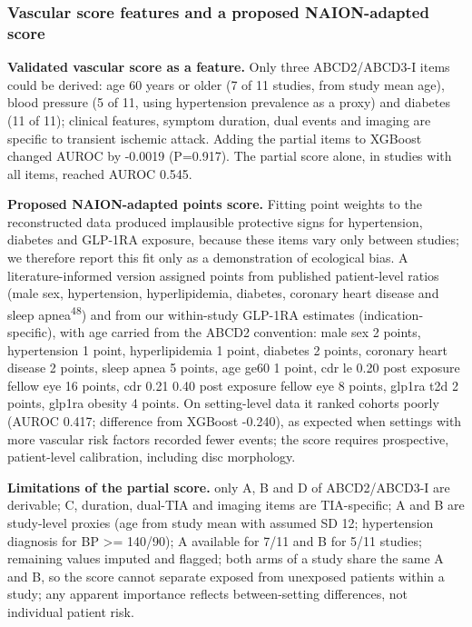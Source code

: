 \documentclass[
  11pt,
]{article}
\begin{document}
\subsubsection{Vascular score features and a proposed NAION-adapted
score}\label{vascular-score-features-and-a-proposed-naion-adapted-score}

\textbf{Validated vascular score as a feature.} Only three ABCD2/ABCD3-I
items could be derived: age 60 years or older (7 of 11 studies, from
study mean age), blood pressure (5 of 11, using hypertension prevalence
as a proxy) and diabetes (11 of 11); clinical features, symptom
duration, dual events and imaging are specific to transient ischemic
attack. Adding the partial items to XGBoost changed AUROC by -0.0019
(P=0.917). The partial score alone, in studies with all items, reached
AUROC 0.545.

\textbf{Proposed NAION-adapted points score.} Fitting point weights to
the reconstructed data produced implausible protective signs for
hypertension, diabetes and GLP-1RA exposure, because these items vary
only between studies; we therefore report this fit only as a
demonstration of ecological bias. A literature-informed version assigned
points from published patient-level ratios (male sex, hypertension,
hyperlipidemia, diabetes, coronary heart disease and sleep
apnea\textsuperscript{48}) and from our within-study GLP-1RA estimates
(indication-specific), with age carried from the ABCD2 convention: male
sex 2 points, hypertension 1 point, hyperlipidemia 1 point, diabetes 2
points, coronary heart disease 2 points, sleep apnea 5 points, age ge60
1 point, cdr le 0.20 post exposure fellow eye 16 points, cdr 0.21 0.40
post exposure fellow eye 8 points, glp1ra t2d 2 points, glp1ra obesity 4
points. On setting-level data it ranked cohorts poorly (AUROC 0.417;
difference from XGBoost -0.240), as expected when settings with more
vascular risk factors recorded fewer events; the score requires
prospective, patient-level calibration, including disc morphology.

\textbf{Limitations of the partial score.} only A, B and D of
ABCD2/ABCD3-I are derivable; C, duration, dual-TIA and imaging items are
TIA-specific; A and B are study-level proxies (age from study mean with
assumed SD 12; hypertension diagnosis for BP \textgreater= 140/90); A
available for 7/11 and B for 5/11 studies; remaining values imputed and
flagged; both arms of a study share the same A and B, so the score
cannot separate exposed from unexposed patients within a study; any
apparent importance reflects between-setting differences, not individual
patient risk.
\end{document}
